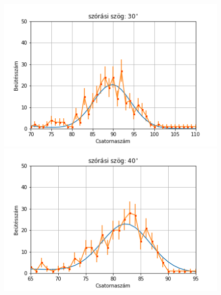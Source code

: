 \documentclass[a4paper,12pt]{article}
\begin{document}
\begin{figure}[!htb]
    \centering
    \begin{minipage}{.49\textwidth}
        \centering
        \includegraphics[width=1.\linewidth]{../plots/withbackground/30_1224fit.png}
    \end{minipage}
    \begin{minipage}{.49\textwidth}
        \centering
        \includegraphics[width=1.\linewidth]{../plots/withbackground/40_1085fit.png}
    \end{minipage}
\end{figure}
\end{document}
